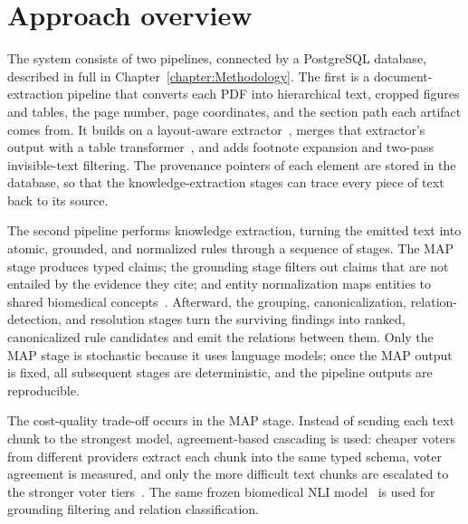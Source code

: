 \section{Approach overview}\label{section:intro-approach-overview}

The system consists of two pipelines, connected by a PostgreSQL database, described in full in Chapter~\ref{chapter:Methodology}. The first is a document-extraction pipeline that converts each PDF into hierarchical text, cropped figures and tables, the page number, page coordinates, and the section path each artifact comes from. It builds on a layout-aware extractor~\parencite{auer2024doclingtechnicalreport}, merges that extractor's output with a table transformer~\parencite{smock2022pubtables1mcomprehensivetable}, and adds footnote expansion and two-pass invisible-text filtering. The provenance pointers of each element are stored in the database, so that the knowledge-extraction stages can trace every piece of text back to its source.

The second pipeline performs knowledge extraction, turning the emitted text into atomic, grounded, and normalized rules through a sequence of stages. The MAP stage produces typed claims; the grounding stage filters out claims that are not entailed by the evidence they cite; and entity normalization maps entities to shared biomedical concepts~\parencite{bodenreider2004umls}. Afterward, the grouping, canonicalization, relation-detection, and resolution stages turn the surviving findings into ranked, canonicalized rule candidates and emit the relations between them. Only the MAP stage is stochastic because it uses language models; once the MAP output is fixed, all subsequent stages are deterministic, and the pipeline outputs are reproducible. 

The cost-quality trade-off occurs in the MAP stage. Instead of sending each text chunk to the strongest model, agreement-based cascading is used: cheaper voters from different providers extract each chunk into the same typed schema, voter agreement is measured, and only the more difficult text chunks are escalated to the stronger voter tiers~\parencite{kolawole2025abc}. The same frozen biomedical NLI model~\parencite{deka2023pubmedbertextended} is used for grounding filtering and relation classification. 